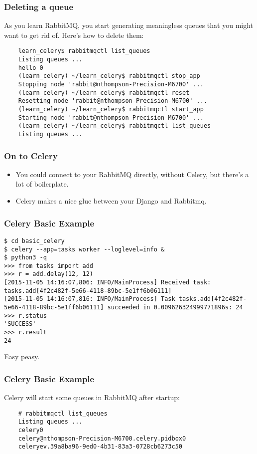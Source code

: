 \documentclass[9pt]{beamer}
\begin{document}
\begin{frame}[fragile]
  \frametitle{Deleting a queue}
  As you learn RabbitMQ, you start generating meaningless queues that you might want to get rid of. Here's how to delete them:
  \begin{verbatim}
    learn_celery$ rabbitmqctl list_queues
    Listing queues ...
    hello 0
    (learn_celery) ~/learn_celery$ rabbitmqctl stop_app
    Stopping node 'rabbit@nthompson-Precision-M6700' ...
    (learn_celery) ~/learn_celery$ rabbitmqctl reset
    Resetting node 'rabbit@nthompson-Precision-M6700' ...
    (learn_celery) ~/learn_celery$ rabbitmqctl start_app
    Starting node 'rabbit@nthompson-Precision-M6700' ...
    (learn_celery) ~/learn_celery$ rabbitmqctl list_queues
    Listing queues ...
  \end{verbatim}
\end{frame}

\begin{frame}[fragile]
  \frametitle{On to Celery}
  \begin{itemize}
  \item You could connect to your RabbitMQ directly, without Celery, but there's a lot of boilerplate.
  \item Celery makes a nice glue between your Django and Rabbitmq.
  \end{itemize}
\end{frame}

\begin{frame}[fragile]
  \frametitle{Celery Basic Example}
  \begin{verbatim}
$ cd basic_celery
$ celery --app=tasks worker --loglevel=info &
$ python3 -q
>>> from tasks import add
>>> r = add.delay(12, 12)
[2015-11-05 14:16:07,806: INFO/MainProcess] Received task: tasks.add[4f2c482f-5e66-4118-89bc-5e1ff6b06111]
[2015-11-05 14:16:07,816: INFO/MainProcess] Task tasks.add[4f2c482f-5e66-4118-89bc-5e1ff6b06111] succeeded in 0.009626324999771896s: 24
>>> r.status
'SUCCESS'
>>> r.result
24
  \end{verbatim}
  Easy peasy.
\end{frame}

\begin{frame}[fragile]
  \frametitle{Celery Basic Example}
  Celery will start some queues in RabbitMQ after startup:
  \begin{verbatim}
    # rabbitmqctl list_queues
    Listing queues ...
    celery0
    celery@nthompson-Precision-M6700.celery.pidbox0
    celeryev.39a8ba96-9ed0-4b31-83a3-0728cb6273c50
  \end{verbatim}
\end{frame}
\end{document}
